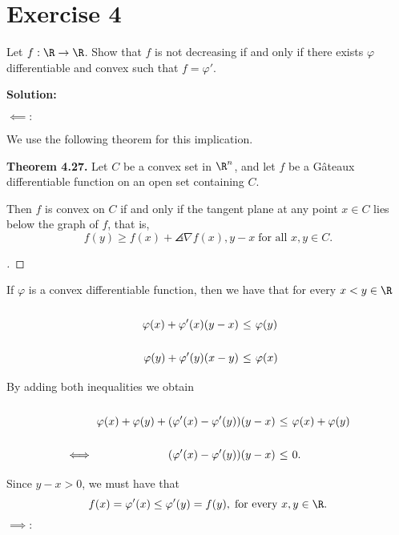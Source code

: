 
\section*{Exercise 4}

Let $f: \R\to \R$. Show that $f$ is not decreasing if and only if there exists $\varphi$ differentiable and convex such that $f = \varphi'$.

\textbf{Solution:} 

\hspace*{-3em}$\boldsymbol{\impliedby:}$ 

We use the following theorem for this implication.

\textbf{Theorem 4.27.} Let $C$ be a convex set in $\R^n$, and let $f$ be a Gâteaux differentiable function on an open set containing $C$.

Then $f$ is convex on $C$ if and only if the tangent plane at any point $x\in C$ lies below the graph of $f$, that is,
\[ f(y) \geq f(x) + \angles{\nabla f(x), y-x}\; \mbox{for all $x,y\in C$}. \]
\begin{proof}[]
\end{proof}

If $\varphi$ is a convex differentiable function, then we have that for every $x < y \in \R$
\[ \everymath{\displaystyle}
\arraycolsep=1.8pt\def\arraystretch{2.5}
\begin{array}{rrcl}
    & \varphi(x) + \varphi'(x)(y-x) & \leq & \varphi(y)\\
    & \varphi(y) + \varphi'(y)(x-y) & \leq & \varphi(x)\\
\end{array} \]
By adding both inequalities we obtain
\[ \everymath{\displaystyle}
\arraycolsep=1.8pt\def\arraystretch{2.5}
\begin{array}{rrcl}
    & \varphi(x)+\varphi(y) + (\varphi'(x) - \varphi'(y))(y-x) & \leq & \varphi(x)+\varphi(y)\\
    \iff & (\varphi'(x) - \varphi'(y))(y-x) & \leq & 0.\\
\end{array} \]
Since $y-x > 0$, we must have that
\[ f(x) = \varphi'(x) \leq \varphi'(y) = f(y),\; \mbox{for every $x,y\in \R$}. \]


\hspace*{-3em}$\boldsymbol{\implies:}$ 

